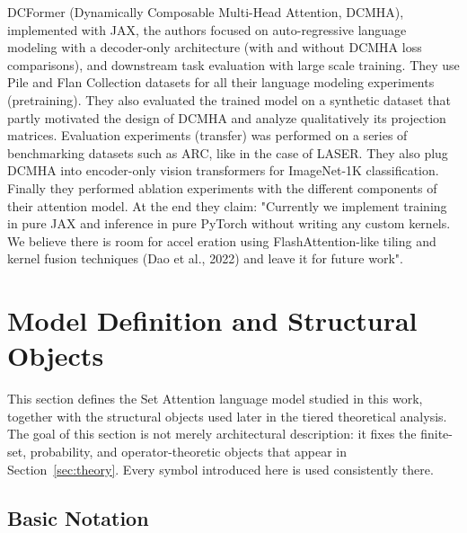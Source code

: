 \documentclass{article}
\theoremstyle{plain}
\theoremstyle{definition}
\theoremstyle{remark}
\begin{document}
DCFormer (Dynamically Composable Multi-Head Attention, DCMHA), implemented with JAX, the authors focused on auto-regressive language modeling with a decoder-only architecture (with and without DCMHA loss comparisons), and downstream task evaluation with large scale training. They use Pile and  Flan Collection datasets for all their language modeling experiments (pretraining). They also evaluated the trained model on a synthetic dataset that partly motivated the design of DCMHA and analyze qualitatively its projection matrices. Evaluation experiments (transfer) was performed on a series of benchmarking datasets such as ARC, like in the case of LASER. They also plug DCMHA into encoder-only vision transformers for ImageNet-1K classification. Finally they performed ablation experiments with the different components of their attention model. At the end they claim: "Currently we implement training in pure JAX and inference in pure PyTorch without writing any custom kernels. We believe there is room for accel eration using FlashAttention-like tiling and kernel fusion techniques (Dao et al., 2022) and leave it for future work". %



\section{Model Definition and Structural Objects}
\label{sec:model-objects}

This section defines the Set Attention language model studied in this work, together with the structural objects used later in the tiered theoretical analysis. The goal of this section is not merely architectural description: it fixes the finite-set, probability, and operator-theoretic objects that appear in Section~\ref{sec:theory}. Every symbol introduced here is used consistently there.

\subsection{Basic Notation}
\label{sec:basic-notation}
\end{document}
